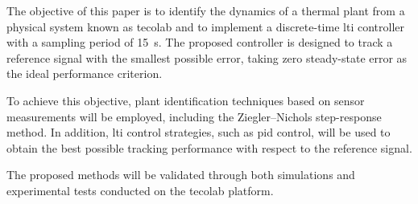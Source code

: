 The objective of this paper is to identify the dynamics of a thermal plant from
a physical system known as \gls{tecolab} and to implement a discrete-time
\gls{lti} controller with a sampling period of \SI{15}{\second}. The proposed
controller is designed to track a reference signal with the smallest possible
error, taking zero steady-state error as the ideal performance criterion.

To achieve this objective, plant identification techniques based on sensor
measurements will be employed, including the Ziegler--Nichols step-response
method. In addition, \gls{lti} control strategies, such as \gls{pid} control,
will be used to obtain the best possible tracking performance with respect to
the reference signal.

The proposed methods will be validated through both simulations and experimental
tests conducted on the \gls{tecolab} platform.
